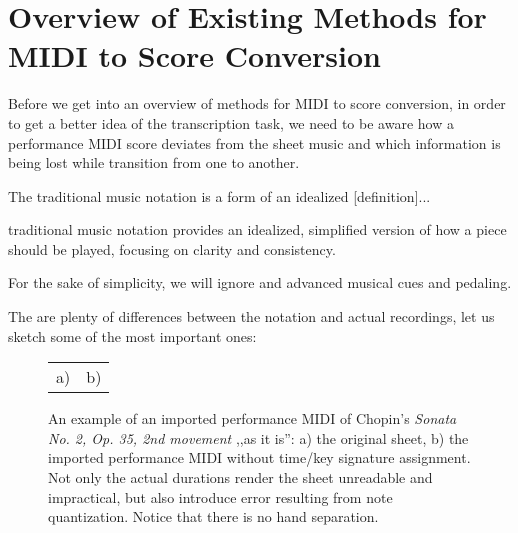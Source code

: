 \chapter{Overview of Existing Methods for MIDI to Score Conversion}

Before we get into an overview of methods for MIDI to score conversion, in order to get a better idea of the transcription task, we need to be aware how a performance MIDI score deviates from the sheet music and which information is being lost while transition from one to another.

{\color{red} The traditional music notation is a form of an idealized [definition]...

traditional music notation provides an idealized, simplified version of how a piece should be played, focusing on clarity and consistency.}

For the sake of simplicity, we will ignore and advanced musical cues and pedaling.

The are plenty of differences between the notation and actual recordings, let us sketch some of the most important ones:

\begin{figure}[ht!]
\centering
\begin{tabular}{cc}a)

 & b)
\end{tabular}
\caption{An example of an imported performance MIDI of Chopin's \emph{Sonata No. 2, Op. 35, 2nd movement} ,,as it is'': a) the original sheet, b) the imported performance MIDI without time/key signature assignment. Not only the actual durations render the sheet unreadable and impractical, but also introduce error resulting from note quantization. Notice that there is no hand separation.}
\label{chopin_sonata}
\end{figure}

